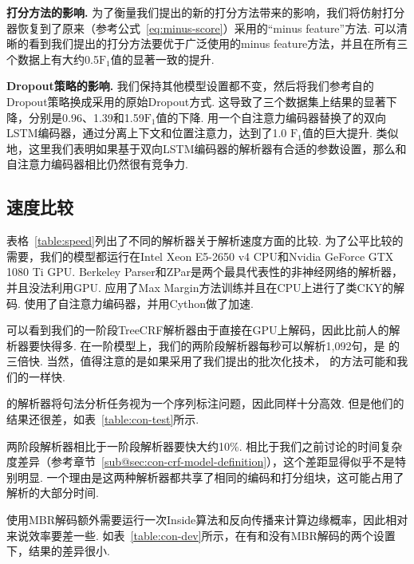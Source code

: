 \noindent\textbf{打分方法的影响.}
为了衡量我们提出的新的打分方法带来的影响，我们将仿射打分器恢复到了原来\citet{stern-etal-2017-minimal}（参考公式~\ref{eq:minus-score}）采用的``minus feature''方法.
可以清晰的看到我们提出的打分方法要优于广泛使用的minus feature方法，并且在所有三个数据上有大约0.5$\mathrm{F}_1$值的显著一致的提升.

\noindent\textbf{Dropout策略的影响.}
我们保持其他模型设置都不变，然后将我们参考自\citet{dozat-etal-2017-biaffine}的Dropout策略换成\citet{stern-etal-2017-minimal}采用的原始Dropout方式.
这导致了三个数据集上结果的显著下降，分别是0.96、1.39和1.59$\mathrm{F}_1$值的下降.
\citet{kitaev-klein-2018-constituency}用一个自注意力编码器替换了\citet{stern-etal-2017-minimal}的双向LSTM编码器，通过分离上下文和位置注意力，达到了1.0 $\mathrm{F}_1$值的巨大提升.
类似地，这里我们表明如果基于双向LSTM编码器的解析器有合适的参数设置，那么和自注意力编码器相比仍然很有竞争力.



\subsection{速度比较}
表格~\ref{table:speed}列出了不同的解析器关于解析速度方面的比较.
为了公平比较的需要，我们的模型都运行在Intel Xeon E5-2650 v4 CPU和Nvidia GeForce GTX 1080 Ti GPU.
Berkeley Parser和ZPar是两个最具代表性的非神经网络的解析器，并且没法利用GPU.
\citet{stern-etal-2017-minimal}应用了Max Margin方法训练并且在CPU上进行了类CKY的解码.
\citet{kitaev-klein-2018-constituency}使用了自注意力编码器，并用Cython做了加速.

可以看到我们的一阶段TreeCRF解析器由于直接在GPU上解码，因此比前人的解析器要快得多.
在一阶模型上，我们的两阶段解析器每秒可以解析1,092句，是 \citet{kitaev-klein-2018-constituency}的三倍快.
当然，值得注意的是如果采用了我们提出的批次化技术， \citet{stern-etal-2017-minimal,kitaev-klein-2018-constituency}的方法可能和我们的一样快.

\citet{gomez-rodriguez-vilares-2018-constituent}的解析器将句法分析任务视为一个序列标注问题，因此同样十分高效.
但是他们的结果还很差，如表~\ref{table:con-test}所示.

两阶段解析器相比于一阶段解析器要快大约10\%.
相比于我们之前讨论的时间复杂度差异（参考章节~\ref{sub@sec:con-crf-model-definition}），这个差距显得似乎不是特别明显.
一个理由是这两种解析器都共享了相同的编码和打分组块，这可能占用了解析的大部分时间.

使用MBR解码额外需要运行一次Inside算法和反向传播来计算边缘概率，因此相对来说效率要差一些.
如表~\ref{table:con-dev}所示，在有和没有MBR解码的两个设置下，结果的差异很小.

